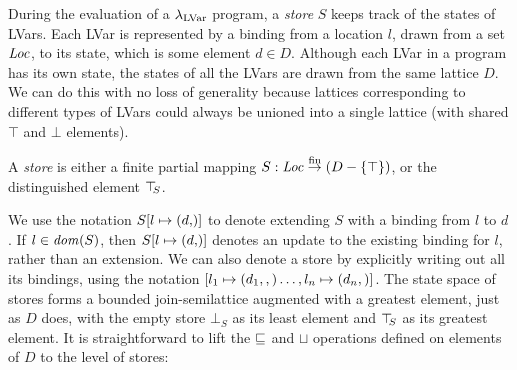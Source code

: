 



During the evaluation of a $\lambda_{\textrm{LVar}}$ program, a \emph{store} $S$
keeps track of the states of LVars.  Each LVar is represented by a
binding from a location $l$, drawn from a set $\mathit{Loc}$, to its state,
which is some element $d \in D$.  Although each LVar in a program has
its own state, the states of all the LVars are drawn from the same
lattice $D$.  We can do this with no loss of generality because
lattices corresponding to different types of LVars could always be
unioned into a single lattice (with shared $\top$ and $\bot$
elements).

\begin{definition}\label{def:store}
A \emph{store} is either a finite partial mapping $S : \mathit{Loc} \stackrel{\textrm{fin}}{\rightarrow} (D-\lbrace \top \rbrace)$, or the distinguished element $\top\hspace{-0.85mm}_{S}$.
\end{definition}

\noindent We use the notation $\extS{S}{l}{d}$ to denote extending $S$
with a binding from $l$ to $d$.  If $l \in \mathit{dom}(S)$, then
$\extS{S}{l}{d}$ denotes an update to the existing binding for $l$,
rather than an extension.  We can also denote a store by explicitly
writing out all its bindings, using the notation
$\left[ l_1 \mapsto (d_1, ,) \dots, l_n \mapsto (d_n, \right)]$.
%
The state space of stores forms a bounded join-semilattice
augmented with a greatest element, just as
$D$ does, with the empty store $\bot_S$ as its least element and $\top\hspace{-0.85mm}_{S}$ 
as its greatest element.
It is straightforward to lift the $\sqsubseteq$ and $\sqcup$ operations defined
on elements of $D$ to the level of stores:


